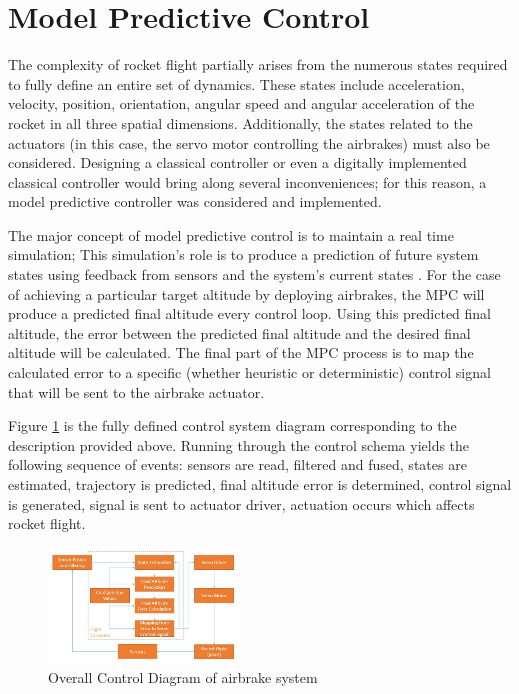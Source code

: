 \documentclass[conference, letterpaper]{IEEEtran}
\begin{document}
\section{Model Predictive Control}

The complexity of rocket flight partially arises from the numerous states
required to fully define an entire set of dynamics. These states include
acceleration, velocity, position, orientation, angular speed and angular
acceleration of the rocket in all three spatial dimensions. Additionally,
the states related to the actuators (in this case, the servo motor controlling
the airbrakes) must also be considered. Designing a classical controller or even
a digitally implemented classical controller would bring along several
inconveniences; for this reason, a model predictive controller was considered
and implemented.

The major concept of model predictive control is to maintain a real time
simulation; This simulation's role is to produce a prediction of future system
states using feedback from sensors and the system's current states \citep{845037}. For the case
of achieving a particular target altitude by deploying airbrakes, the MPC will
produce a predicted final altitude
every control loop. Using this predicted final altitude, the error between the
predicted final altitude and the desired final altitude will be calculated. The
final part of the MPC process is to map the calculated error to a specific
(whether heuristic or deterministic) control signal that will be sent to the
airbrake actuator.

Figure \ref{fig:MPC_diagram} is the fully defined control system diagram
corresponding to the description provided above. Running through the control
schema yields the following sequence of events: sensors are read, filtered and
fused, states are estimated, trajectory is predicted, final altitude error is
determined, control signal is generated, signal is sent to actuator driver,
actuation occurs which affects rocket flight.

\begin{figure}[H]
\centering
\includegraphics[width=0.45\textwidth]{./MPC_diagram}
\caption{Overall Control Diagram of airbrake system}
\label{fig:MPC_diagram}
\end{figure}
\end{document}
